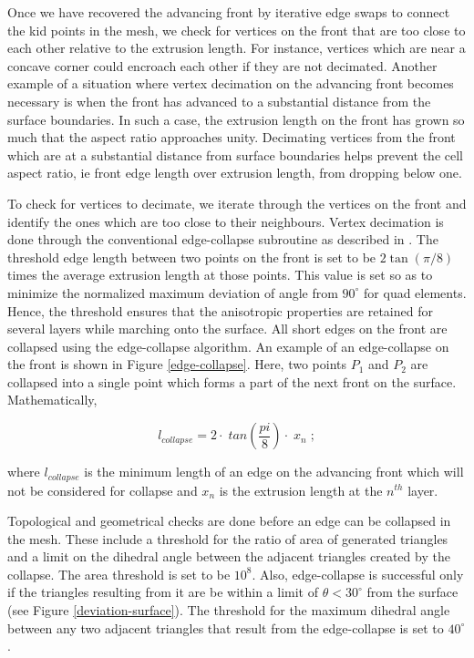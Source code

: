 Once we have recovered the advancing front by iterative edge swaps to connect the kid points in the mesh, we check for vertices on the front that are too close to each other relative to the extrusion length. For instance, vertices which are near a concave corner could encroach each other if they are not decimated. Another example of a situation where vertex decimation on the advancing front becomes necessary is when the front has advanced to a substantial distance from the surface boundaries. In such a case, the extrusion length on the front has grown so much that the aspect ratio approaches unity. Decimating vertices from the front which are at a substantial distance from surface boundaries helps prevent the cell aspect ratio, ie front edge length over extrusion length, from dropping below one.

To check for vertices to decimate, we iterate through the vertices on the front and identify the ones which are too close to their neighbours. Vertex decimation is done through the conventional edge-collapse subroutine as described in \cite{hoppe1994mesh}. The threshold edge length between two points on the front is set to be $2 \tan(\pi/8)$ times the average extrusion length at those points. This value is set so as to minimize the normalized maximum deviation of angle from $90^\circ$ for quad elements. Hence, the threshold ensures that the anisotropic properties are retained for several layers while marching onto the surface. All short edges on the front are collapsed using the edge-collapse algorithm. An example of an edge-collapse on the front is shown in Figure \ref{edge-collapse}. Here, two points $P_1$ and $P_2$ are collapsed into a single point which forms a part of the next front on the surface. Mathematically,

\begin{equation}
l_{\mathit{collapse}} = 2 \cdot \; tan \left( \frac{pi}{8} \right) \cdot \; x_n \; ;
\end{equation}

where $l_{\mathit{collapse}}$ is the minimum length of an edge on the advancing front which will not be considered for collapse and $x_n$ is the extrusion length at the $n^{th}$ layer.


Topological and geometrical checks are done before an edge can be collapsed in the mesh. These include a threshold for the ratio of area of generated triangles and a limit on the dihedral angle between the adjacent triangles created by the collapse. The area threshold is set to be $10^8$. Also, edge-collapse is successful only if the triangles resulting from it are be within a limit of $\theta < 30^{\circ}$ from the surface (see Figure \ref{deviation-surface}). The threshold for the maximum dihedral angle between any two adjacent triangles that result from the edge-collapse is set to $40^{\circ}$. 

